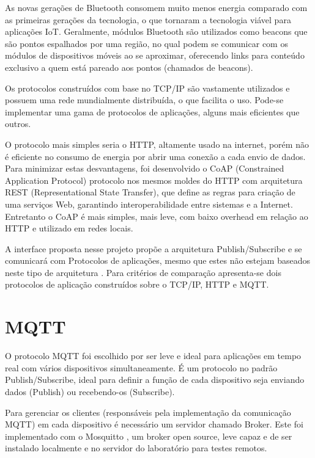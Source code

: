 As novas gerações de Bluetooth consomem muito menos energia comparado com as primeiras gerações da tecnologia, o que tornaram a tecnologia viável para aplicações IoT. Geralmente, módulos Bluetooth são utilizados como beacons \cite{Endeavor:Beacons} que são  pontos espalhados por uma região, no qual podem se comunicar com os módulos de dispositivos móveis ao se aproximar, oferecendo links para conteúdo exclusivo a quem está pareado aos pontos (chamados de beacons).

Os protocolos construídos com base no TCP/IP são vastamente utilizados e possuem uma rede mundialmente distribuída, o que facilita o uso. Pode-se implementar uma gama de protocolos de aplicações, alguns mais eficientes que outros.

O protocolo mais simples seria o HTTP, altamente usado na internet, porém não é eficiente no consumo de energia por abrir uma conexão a cada envio de dados. Para minimizar estas desvantagens, foi desenvolvido o CoAP (Constrained Application Protocol) \cite{coap} protocolo nos mesmos moldes do HTTP com arquitetura REST (Representational State Transfer), que define as regras para criação de uma serviços Web, garantindo interoperabilidade entre sistemas e a Internet. Entretanto o CoAP é mais simples, mais leve, com baixo overhead em relação ao HTTP e utilizado em redes locais.

A interface proposta nesse projeto propõe a arquitetura Publish/Subscribe e se comunicará com Protocolos de aplicações, mesmo que estes não estejam baseados neste tipo de arquitetura . Para critérios de comparação apresenta-se dois protocolos de aplicação construídos sobre o TCP/IP, HTTP e MQTT.

\section{MQTT}
\label{section:mqtt}

O protocolo MQTT foi escolhido por ser leve e ideal para aplicações em tempo real com vários dispositivos simultaneamente. É um protocolo no padrão Publish/Subscribe, ideal para definir a função de cada dispositivo seja enviando dados (Publish) ou recebendo-os (Subscribe).

Para gerenciar os clientes (responsáveis pela implementação da comunicação MQTT) em cada dispositivo é necessário um servidor chamado Broker. Este foi implementado com o Mosquitto \cite{mosquitto}, um broker open source, leve capaz e de ser instalado localmente e no servidor do laboratório para testes remotos.

